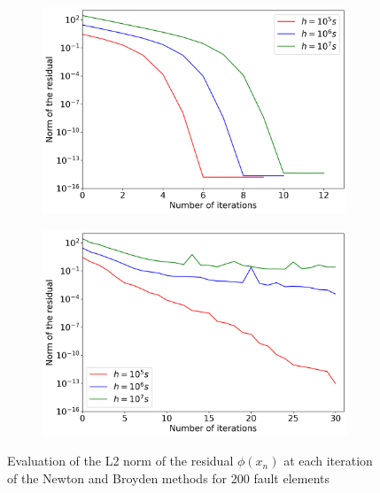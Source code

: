 \begin{figure}[H]
	\centering
	\begin{subfigure}{0.45\textwidth}
		\centering
		\includegraphics[width=1\textwidth]{images/NewtonIterationConvergence200Elements_DifferentDT_Analytic.png}
	\end{subfigure}
	\begin{subfigure}{0.45\textwidth}
		\centering
		\includegraphics[width=1\textwidth]{images/NewtonIterationConvergence200Elements_DifferentDT_Broyden.png}
	\end{subfigure}
	\caption{Evaluation of the L2 norm of the residual $\phi(x_n)$ at each iteration of the Newton and Broyden methods for 200 fault elements}
	\label{fig:convergenceNewtonAndBroydenDifferentTimeSteps}
\end{figure}

